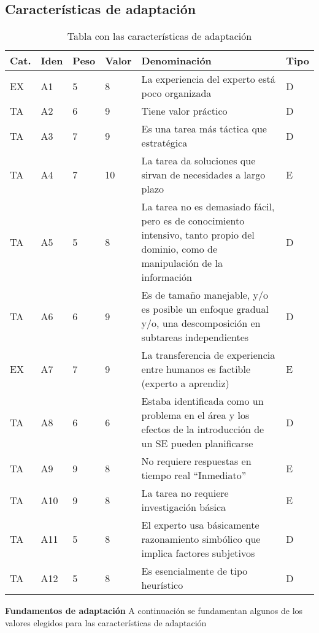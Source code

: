 \subsection{Características de adaptación}
\begin{table}[htb]%
  \centering
  \caption{Tabla con las características de adaptación}
  \label{tab:anchura}
  \begin{tabular}{ | l | l | l | l | p{8cm} | l | }
    \hline
    Cat. & Iden & Peso & Valor & Denominación & Tipo \\ \hline
    EX & A1 & 5 & 8 & La experiencia del experto está poco organizada & D \\ \hline
    TA & A2 & 6 & 9 & Tiene valor práctico & D \\ \hline
    TA & A3 & 7 & 9 & Es una tarea más táctica que estratégica & D \\ \hline
    TA & A4 & 7 & 10 & La tarea da soluciones que sirvan de necesidades a largo plazo & E \\ \hline
    TA & A5 & 5 & 8 & La tarea no es demasiado fácil, pero es de conocimiento intensivo, tanto propio del dominio, como de manipulación de la información & D \\ \hline
    TA & A6 & 6 & 9 & Es de tamaño manejable, y/o es posible un enfoque gradual y/o, una descomposición en subtareas independientes & D \\ \hline
    EX & A7 & 7 & 9 & La transferencia de experiencia entre humanos es factible (experto a aprendiz) & E \\ \hline
    TA & A8 & 6 & 6 & Estaba identificada como un problema en el área y los efectos de la introducción de un SE pueden planificarse & D \\ \hline
    TA & A9 & 9 & 8 & No requiere respuestas en tiempo real “Inmediato” & E \\ \hline
    TA & A10 & 9 & 8 & La tarea no requiere investigación básica & E \\ \hline
    TA & A11 & 5 & 8 & El experto usa básicamente razonamiento simbólico que implica factores subjetivos & D \\ \hline
    TA & A12 & 5 & 8 & Es esencialmente de tipo heurístico & D \\ \hline
  \end{tabular}
\end{table}

\textbf{Fundamentos de adaptación}
A continuación se fundamentan algunos de los valores elegidos para las características de adaptación

